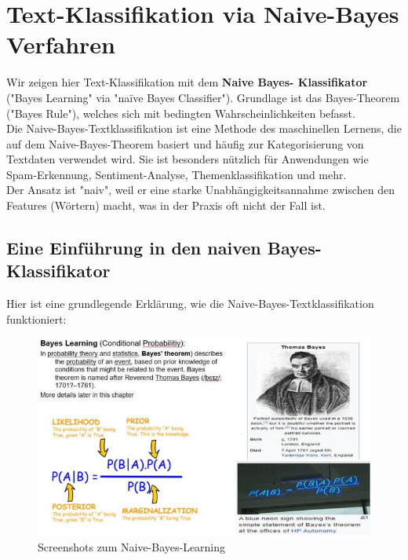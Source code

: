 \documentclass[12pt]{article}
\begin{document}
\newpage

\section{Text-Klassifikation via Naive-Bayes Verfahren \\}


Wir zeigen hier Text-Klassifikation mit dem \textbf{Naive Bayes- Klassifikator} ("Bayes Learning" via "naïve Bayes Classifier"). Grundlage ist das Bayes-Theorem ("Bayes Rule"), welches sich mit bedingten Wahrscheinlichkeiten befasst.\\
Die Naive-Bayes-Textklassifikation ist eine Methode des maschinellen Lernens, die auf dem Naive-Bayes-Theorem basiert und häufig zur Kategorisierung von Textdaten verwendet wird. Sie ist besonders nützlich für Anwendungen wie Spam-Erkennung, Sentiment-Analyse, Themenklassifikation und mehr.\\

Der Ansatz ist "naiv", weil er eine starke Unabhängigkeitsannahme zwischen den Features (Wörtern) macht, was in der Praxis oft nicht der Fall ist.

\subsection{Eine Einführung in den naiven Bayes-Klassifikator}

Hier ist eine grundlegende Erklärung, wie die Naive-Bayes-Textklassifikation funktioniert:\\

\begin{figure}[htb]
  \centering
  \hspace*{-1.5cm} 
  \includegraphics[width=1.2\textwidth]{Naive-Bayes-Learning}
  \caption{Screenshots zum Naive-Bayes-Learning}
\label{fig:NB_Learning}
\end{figure}
\end{document}
